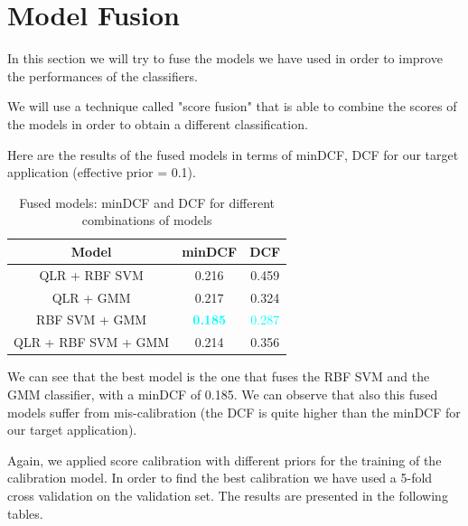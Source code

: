 \documentclass[12pt]{report}
\newcommand{\nnl}{%
    \newline
    \newline
}
\newcommand{\nl}{%
    \newline
    \noindent
}
\begin{document}
\section{Model Fusion}
In this section we will try to fuse the models we have used in order to improve the performances of the classifiers.
\nl
We will use a technique called "score fusion" that is able to combine the scores of the models in order to obtain a different classification.
\nnl
Here are the results of the fused models in terms of minDCF, DCF for our target application (effective prior = 0.1).
\begin{table}[H]
    \centering
    \begin{tabular}{|c|c|c|}
        \hline
        \rowcolor{blue!10}
        \textbf{Model}      & \textbf{minDCF}                  & \textbf{DCF}            \\
        \hline
        QLR + RBF SVM       & 0.216                            & 0.459                   \\
        \hline
        QLR + GMM           & 0.217                            & 0.324                   \\
        \hline
        RBF SVM + GMM       & \textcolor{cyan}{\textbf{0.185}} & \textcolor{cyan}{0.287} \\
        \hline
        QLR + RBF SVM + GMM & 0.214                            & 0.356                   \\
        \hline
    \end{tabular}
    \caption{Fused models: minDCF and DCF for different combinations of models}
    \label{tab:Fused_Models}
\end{table}
\noindent
We can see that the best model is the one that fuses the RBF SVM and the GMM classifier, with a minDCF of 0.185. We can observe that also this fused models suffer from mis-calibration (the DCF is quite higher than the minDCF for our target application).
\nnl
Again, we applied score calibration with different priors for the training of the calibration model. In order to find the best calibration we have used a 5-fold cross validation on the validation set.
\nl The results are presented in the following tables.
\end{document}
